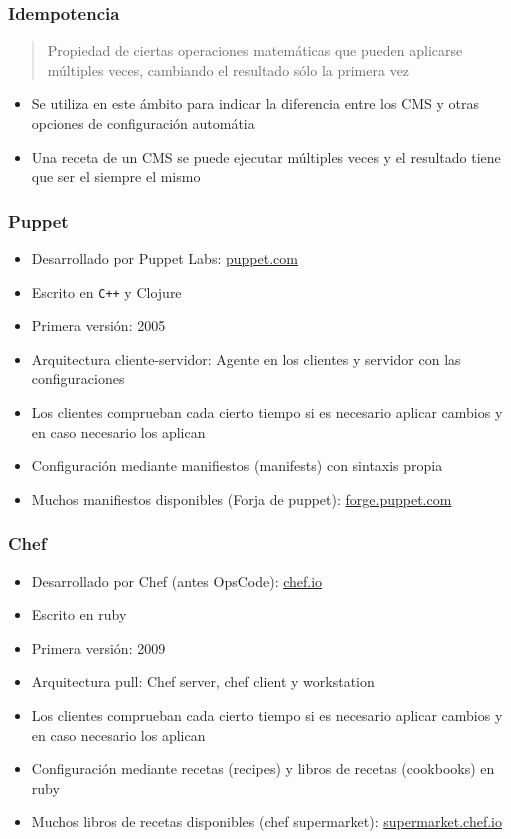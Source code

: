 \documentclass[aspectratio=169]{beamer}
\begin{document}
\begin{frame}
  \frametitle{Idempotencia}
  \begin{quote}
    Propiedad de ciertas operaciones matemáticas que pueden aplicarse múltiples veces, cambiando el resultado sólo la primera vez
  \end{quote}
  \begin{itemize}
  \item Se utiliza en este ámbito para indicar la diferencia entre los CMS y otras opciones de configuración automátia
  \item Una receta de un CMS se puede ejecutar múltiples veces y el resultado tiene que ser el siempre el mismo
  \end{itemize}
\end{frame}

\begin{frame}
  \frametitle{Puppet}
  \begin{itemize}
  \item Desarrollado por Puppet Labs: \href{https://puppet.com/}{puppet.com}
  \item Escrito en \texttt{C++} y Clojure
  \item Primera versión: 2005
  \item Arquitectura cliente-servidor: Agente en los clientes y servidor con las configuraciones
  \item Los clientes comprueban cada cierto tiempo si es necesario aplicar cambios y en caso necesario los aplican
  \item Configuración mediante manifiestos (manifests) con sintaxis propia
  \item Muchos manifiestos disponibles (Forja de puppet): \href{https://forge.puppet.com/}{forge.puppet.com}
  \end{itemize}
\end{frame}

\begin{frame}
  \frametitle{Chef}
\begin{itemize}
\item Desarrollado por Chef (antes OpsCode): \href{https://www.chef.io/}{chef.io}
\item Escrito en ruby
\item Primera versión: 2009
\item Arquitectura pull: Chef server, chef client y workstation
\item Los clientes comprueban cada cierto tiempo si es necesario aplicar cambios y en caso necesario los aplican
\item Configuración mediante recetas (recipes) y libros de recetas (cookbooks) en ruby
\item Muchos libros de recetas disponibles (chef supermarket): \href{https://supermarket.chef.io/}{supermarket.chef.io}
\end{itemize}
\end{frame}
\end{document}
